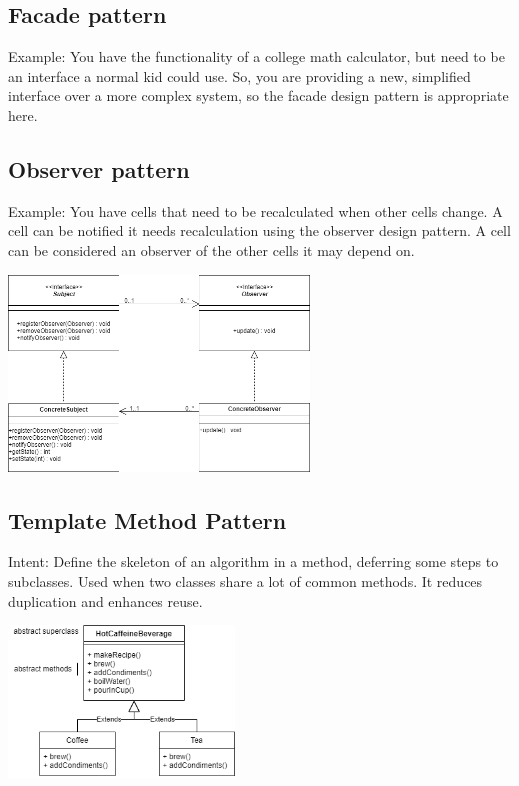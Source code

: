 \documentclass[8pt, letterpaper, titlepage]{article}
\begin{document}
\begin{multicols*}{2}
    \subsection*{Facade pattern}
    Example:
    You have the functionality of a college math calculator, but need to be an interface a normal kid could use. So, you are providing a new, simplified interface over a more complex system, so the facade design pattern is appropriate here.

    \subsection*{Observer pattern}
    Example:
    You have cells that need to be recalculated when other cells change. A cell can be notified it needs recalculation using the observer design pattern. A cell can be considered an observer of the other cells it may depend on.
    
    \begin{center}
        \includegraphics[width=8cm]{observer.png}
    \end{center}

    \vfill\null
    \columnbreak

    \subsection*{Template Method Pattern}
    Intent: Define the skeleton of an algorithm in a method, deferring some steps to subclasses.
    Used when two classes share a lot of common methods. It reduces duplication and enhances reuse. \\
    \begin{center} 
        \includegraphics[width=6cm]{template.png}
    \end{center}


\end{multicols*}
\end{document}
